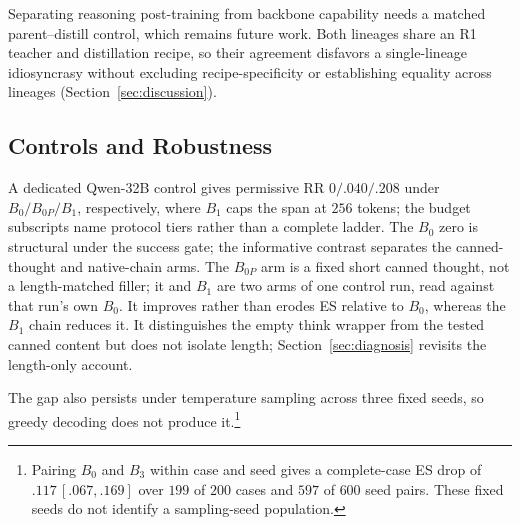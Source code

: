 \documentclass[letterpaper]{article} %
\begin{document}
Separating reasoning post-training from backbone capability needs a matched parent--distill control, which remains future work.  Both lineages share an R1 teacher and distillation recipe, so their agreement disfavors a single-lineage idiosyncrasy without excluding recipe-specificity or establishing equality across lineages (Section~\ref{sec:discussion}).

\subsection{Controls and Robustness}
\label{sec:gap-controls}

A dedicated Qwen-32B control gives permissive RR \(0/.040/.208\) under \(B_0/B_{0P}/B_1\), respectively, where \(B_1\) caps the span at \(256\) tokens; the budget subscripts name protocol tiers rather than a complete ladder. %
The \(B_0\) zero is structural under the success gate; the informative contrast separates the canned-thought and native-chain arms.
The \(B_{0P}\) arm is a fixed short canned thought, not a length-matched filler; it and \(B_1\) are two arms of one control run, read against that run's own \(B_0\).  It improves rather than erodes ES relative to \(B_0\), whereas the \(B_1\) chain reduces it.
It distinguishes the empty think wrapper from the tested canned content but does not isolate length; Section~\ref{sec:diagnosis} revisits the length-only account.

The gap also persists under temperature sampling across three fixed seeds, so greedy decoding does not produce it.\footnote{Pairing \(B_0\) and \(B_3\) within case and seed gives a complete-case ES drop of \(.117\,[.067,.169]\) over \(199\) of \(200\) cases and \(597\) of \(600\) seed pairs. These fixed seeds do not identify a sampling-seed population.} %
\end{document}
